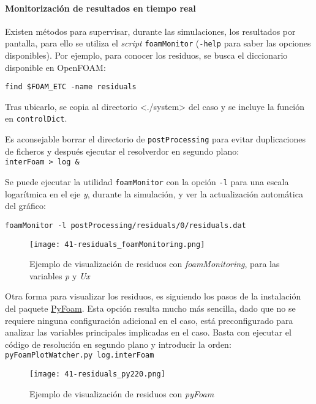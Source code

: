 \paragraph{Monitorización de resultados en tiempo
real}\label{header-n476}

Existen métodos para supervisar, durante las simulaciones, los
resultados por pantalla, para ello se utiliza el \emph{script}
\texttt{foamMonitor} (\texttt{-help} para saber las opciones
disponibles). Por ejemplo, para conocer los residuos, se busca el
diccionario disponible en OpenFOAM:

\texttt{find\ \$FOAM\_ETC\ -name\ residuals}

Tras ubicarlo, se copia al directorio \textless{}./system\textgreater{}
del caso y se incluye la función en \texttt{controlDict}.

Es aconsejable borrar el directorio de \texttt{postProcessing} para
evitar duplicaciones de ficheros y después ejecutar el resolverdor en
segundo plano: \texttt{interFoam\ \textgreater{}\ log\ \&}

Se puede ejecutar la utilidad \texttt{foamMonitor} con la opción
\texttt{-l} para una escala logarítmica en el eje \emph{y}, durante la
simulación, y ver la actualización automática del gráfico:

\texttt{foamMonitor\ -l\ postProcessing/residuals/0/residuals.dat}

\begin{figure}
\centering
\texttt{[image: 41-residuals\_foamMonitoring.png]}
\caption[Ejemplo de visualización de residuos con \emph{foamMonitoring}]{Ejemplo de visualización de residuos con \emph{foamMonitoring}, para las variables \emph{p} y \emph{Ux}}
\label{fig:residuals_foamMonitoring}
\end{figure}

Otra forma para visualizar los residuos, es siguiendo los pasos de la
instalación del paquete
\href{http://openfoamwiki.net/index.php/Contrib/PyFoam}{PyFoam}. Esta
opción resulta mucho más sencilla, dado que no se requiere ninguna
configuración adicional en el caso, está preconfigurado para analizar
las variables principales implicadas en el caso. Basta con ejecutar el
código de resolución en segundo plano y introducir la orden:
\texttt{pyFoamPlotWatcher.py\ log.interFoam}

\begin{figure}
\centering
\texttt{[image: 41-residuals\_py220.png]}
\caption{Ejemplo de visualización de residuos con \emph{pyFoam}}
\label{fig:residuals_py220}
\end{figure}
